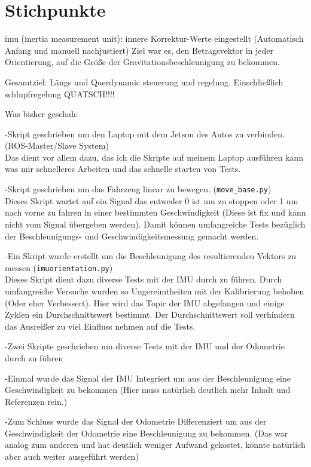\section*{Stichpunkte%
         \label{sec:}}
         
imu (inertia measurement unit):
innere Korrektur-Werte eingestellt (Automatisch Anfang und manuell nachjustiert)
Ziel war es, den Betragsvektor in jeder Orientierung, auf die Größe der Gravitationsbeschleunigung zu bekommen. 

Gesamtziel: Längs und Querdynamic steuerung und regelung. Einschließlich schlupfregelung QUATSCH!!!!

Was bisher geschah:

-Skript geschrieben um den Laptop mit dem Jetson des Autos zu verbinden. (ROS-Master/Slave System)\\
Das dient vor allem dazu, das ich die Skripte auf meinem Laptop ausführen kann was mir schnelleres Arbeiten und das schnelle starten von Tests.

-Skript geschrieben um das Fahrzeug linear zu bewegen. (\lstinline{move_base.py})\\
Dieses Skript wartet auf ein Signal das entweder 0 ist um zu stoppen oder 1 um nach vorne zu fahren in einer bestimmten Geschwindigkeit (Diese ist fix und kann nicht vom Signal übergeben werden). Damit können umfangreiche Tests bezüglich der Beschleunigungs- und Geschwindigkeitsmessung gemacht werden.

-Ein Skript wurde erstellt um die Beschleunigung des resultierenden Vektors zu messen (\lstinline{imuorientation.py})\\
Dieses Skript dient dazu diverse Tests mit der IMU durch zu führen. Durch umfangreiche Versuche wurden so Ungereimtheiten mit der Kalibrierung behoben (Oder eher Verbessert). Hier wird das Topic der IMU abgefangen und einige Zyklen ein Durchschnittswert bestimmt. Der Durchschnittswert soll verhindern das Ausreißer zu viel Einfluss nehmen auf die Tests.

-Zwei Skripte geschrieben um diverse Tests mit der IMU und der Odometrie durch zu führen

    -Einmal wurde das Signal der IMU Integriert um aus der Beschleunigung eine Geschwindigkeit zu bekommen (Hier muss natürlich deutlich mehr Inhalt und Referenzen rein.)
    
    -Zum Schluss wurde das Signal der Odometrie Differenziert um aus der Geschwindigkeit der Odometrie eine Beschleunigung zu bekommen. (Das war analog zum anderen und hat deutlich weniger Aufwand gekostet, könnte natürlich aber auch weiter ausgeführt werden)
    
